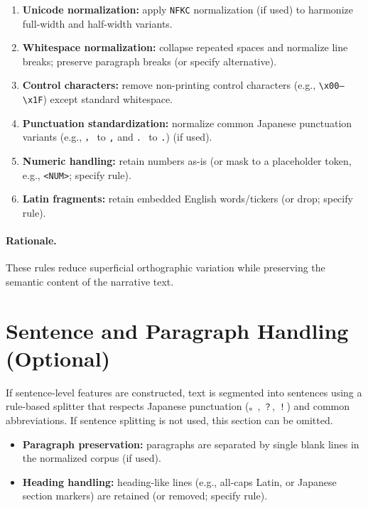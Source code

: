 \begin{enumerate}
  \item \textbf{Unicode normalization:} apply \texttt{NFKC} normalization (if used) to harmonize full-width and half-width variants.
  \item \textbf{Whitespace normalization:} collapse repeated spaces and normalize line breaks; preserve paragraph breaks (or specify alternative).
  \item \textbf{Control characters:} remove non-printing control characters (e.g., \texttt{\textbackslash x00--\textbackslash x1F}) except standard whitespace.
  \item \textbf{Punctuation standardization:} normalize common Japanese punctuation variants (e.g., \texttt{，} to \texttt{,} and \texttt{．} to \texttt{.}) (if used).
  \item \textbf{Numeric handling:} retain numbers as-is (or mask to a placeholder token, e.g., \texttt{<NUM>}; specify rule).
  \item \textbf{Latin fragments:} retain embedded English words/tickers (or drop; specify rule).
\end{enumerate}

\paragraph{Rationale.}
These rules reduce superficial orthographic variation while preserving the semantic content of the narrative text.

\section{Sentence and Paragraph Handling (Optional)}
\label{appendix:sentence_paragraph}

If sentence-level features are constructed, text is segmented into sentences using a rule-based splitter that respects Japanese punctuation (\texttt{。}, \texttt{？}, \texttt{！}) and common abbreviations. If sentence splitting is not used, this section can be omitted.

\begin{itemize}
  \item \textbf{Paragraph preservation:} paragraphs are separated by single blank lines in the normalized corpus (if used).
  \item \textbf{Heading handling:} heading-like lines (e.g., all-caps Latin, or Japanese section markers) are retained (or removed; specify rule).
\end{itemize}

